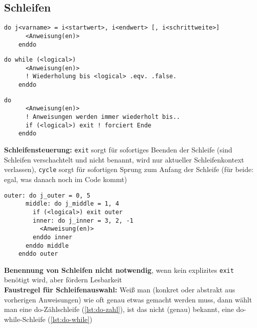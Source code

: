 \documentclass[a4paper, twocolumn]{scrarticle}
\begin{document}
  \subsection{Schleifen}
  \begin{lstlisting}[caption={\bfseries do-Zählschleife (Schrittweite standardmäßig 1, kann auch negativ sein)}, label=lst:do-zahl]
    do j<varname> = i<startwert>, i<endwert> [, i<schrittweite>]
      <Anweisung(en)>
    enddo
  \end{lstlisting}
  \begin{lstlisting}[caption={\bfseries do-while-Schleife}, label=lst:do-while]
    do while (<logical>)
      <Anweisung(en)>
      ! Wiederholung bis <logical> .eqv. .false.
    enddo
  \end{lstlisting}
  \begin{lstlisting}[caption={\bfseries do-Schleife (CAVE!)}, label=lst:do]
    do
      <Anweisung(en)>
      ! Anweisungen werden immer wiederholt bis..
      if (<logical>) exit ! forciert Ende
    enddo
  \end{lstlisting}
 \textbf{Schleifensteuerung:} \lstinline|exit| sorgt für sofortiges Beenden der Schleife (sind Schleifen verschachtelt und nicht benannt, wird nur aktueller Schleifenkontext verlassen), \lstinline|cycle| sorgt für sofortigen Sprung zum Anfang der Schleife (für beide: egal, was danach noch im Code kommt)
  \begin{lstlisting}[caption={\bfseries Benannte do-Schleifen und explizites exit}]
    outer: do j_outer = 0, 5
      middle: do j_middle = 1, 4
        if (<logical>) exit outer
        inner: do j_inner = 3, 2, -1
          <Anweisung(en)>
        enddo inner
      enddo middle
    enddo outer
  \end{lstlisting}
 \textbf{Benennung von Schleifen nicht notwendig}, wenn kein explizites \lstinline|exit| benötigt wird, aber fördern Lesbarkeit\\
  \textbf{Faustregel für Schleifenauswahl:} Weiß man (konkret oder abstrakt aus vorherigen Anweisungen) wie oft genau etwas gemacht werden muss, dann wählt man eine do-Zählschleife (\cref{lst:do-zahl}), ist das nicht (genau) bekannt, eine do-while-Schleife (\cref{lst:do-while})
  
\end{document}
